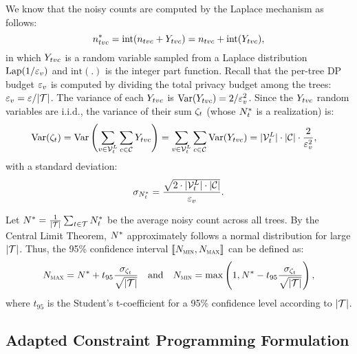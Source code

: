 We know that the noisy counts are computed by the Laplace mechanism as follows:
\[
\nodesupport[\tree,\node,\class]^* = \textrm{int}(\nodesupport[\tree,\node,\class] + \noisevar_{\tree\node\class}) = \nodesupport[\tree,\node,\class]  +  \textrm{int}( \noisevar_{\tree\node\class}) ,
\]
in which $Y_{tvc}$ is a random variable sampled from a Laplace distribution \( \text{Lap}(1 / \varepsilon_v)\) and
$\textrm{int}(.)$ is the integer part function. Recall that the per-tree DP budget $\varepsilon_v$ is computed by dividing the total privacy budget among the trees: $\varepsilon_v = \varepsilon/\lvert \mathcal{T} \rvert$.
The variance of each $Y_{tvc}$ is $\text{Var}(Y_{tvc}) = 2 / \varepsilon_v^2$. Since the $Y_{tvc}$ random variables are i.i.d., the variance of their sum $\zeta_t$ (whose $N_t^*$ is a realization) is:
\begin{align*}
     \text{Var}(\sumnoisevars_\tree) &= \text{Var}\left(\sum\limits_{\node \in \leaves[\tree]} \sum\limits_{\class \in \classes} \noisevar_{\tree\node\class}\right) 
     = \sum\limits_{\node \in \leaves[\tree]} \sum\limits_{\class \in \classes} \text{Var}(\noisevar_{\tree\node\class})    
    = \vert \leaves[\tree] \rvert \cdot \lvert \classes \rvert \cdot \frac{2}{\varepsilon_\node^2},
\end{align*} 
with a standard deviation:
\[
\sigma_{\nexamples_\tree^*} = \frac{\sqrt{2 \cdot \lvert \leaves[\tree] \rvert \cdot \lvert \classes \rvert}}{\varepsilon_\node}.
\]

Let $N^* = \frac{1}{\lvert \mathcal{T} \rvert} \sum_{t \in \mathcal{T}} N_t^*$ be the average noisy count across all trees. By the Central Limit Theorem, $N^*$ approximately follows a normal distribution for large $\lvert \mathcal{T} \rvert$. Thus, the 95\% confidence interval $\llbracket N_{\textsc{min}}, N_{\textsc{max}} \rrbracket$ can be defined as:
\[
    N_{\textsc{max}} = N^* + t_{95} \frac{\sigma_{\zeta_t}}{\sqrt{\lvert \mathcal{T} \rvert}} \quad \text{and} \quad N_{\textsc{min}} = \max\left(1,N^* - t_{95} \frac{\sigma_{\zeta_t}}{\sqrt{\lvert \mathcal{T} \rvert}}\right),
\]
where $t_{95}$ is the Student's t-coefficient for a 95\% confidence level according to $\lvert \mathcal{T} \rvert$.


\subsection{Adapted Constraint Programming Formulation}


